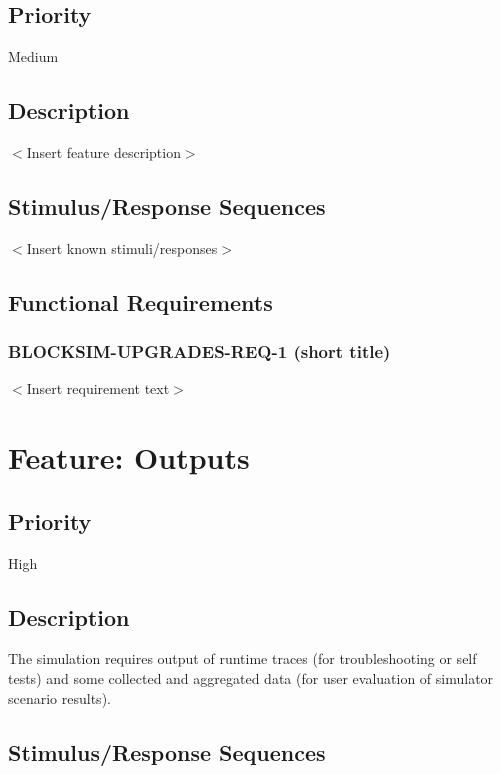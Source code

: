 \documentclass{scrreprt}
\begin{document}
\subsection{Priority}

Medium

\subsection{Description}

$<$Insert feature description$>$


\subsection{Stimulus/Response Sequences}

$<$Insert known stimuli/responses$>$


\subsection{Functional Requirements}

\subsubsection{BLOCKSIM-UPGRADES-REQ-1 (short title)}

$<$Insert requirement text$>$





\section{Feature: Outputs}

\subsection{Priority}

High


\subsection{Description}

The simulation requires output of runtime traces (for troubleshooting or
self tests) and some collected and aggregated data (for user evaluation of
simulator scenario results).


\subsection{Stimulus/Response Sequences}
\end{document}
